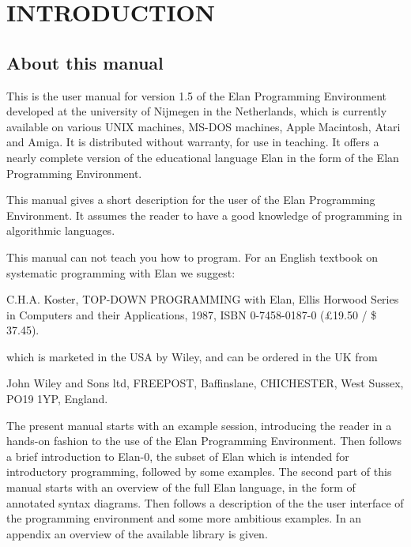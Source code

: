 \chapter*{INTRODUCTION}

\section*{About this  manual}

This is the user manual for version 1.5 of the Elan Programming
Environment developed at the university of Nijmegen in the Netherlands,
which is currently available on various UNIX machines, MS-DOS machines,
Apple Macintosh, Atari and Amiga.
It is distributed without warranty, for use in teaching.
It offers a nearly complete version of the educational language Elan
in the form of the Elan Programming Environment.

This manual gives a short description for the user of the Elan Programming
Environment. It assumes the reader to have a good knowledge of programming
in algorithmic languages.

This manual can not teach you how to program.
For an English textbook on systematic programming with Elan we suggest:

\begin{literal}
C.H.A. Koster, TOP-DOWN PROGRAMMING with Elan,
Ellis Horwood Series in Computers and their Applications,
1987, ISBN 0-7458-0187-0 (\pounds 19.50 / \$ 37.45).
\end{literal}

\noindent
which is marketed in the USA by Wiley, and can be ordered in the UK from

\begin{literal}
John Wiley and Sons ltd, FREEPOST, Baffinslane,
CHICHESTER, West Sussex, PO19 1YP, England.
\end{literal}

\noindent
The present manual starts with an example session, introducing
the reader in a hands-on fashion to the use of the Elan Programming
Environment. Then follows a brief introduction to Elan-0, the
subset of Elan which is intended for introductory programming,
followed by some examples. The second part of this manual starts
with an overview of the full Elan language, in the form of annotated
syntax diagrams. Then follows a description of the the user interface
of the programming environment and some more ambitious examples.
In an appendix an overview of the available library is given.

